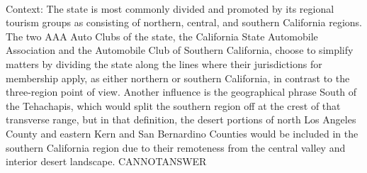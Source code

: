 \documentclass[11pt,a4paper, onecolumn]{article}
\begin{document}
\\ Context: The state is most commonly divided and promoted by its regional tourism groups as consisting of northern, central, and southern California regions. The two AAA Auto Clubs of the state, the California State Automobile Association and the Automobile Club of Southern California, choose to simplify matters by dividing the state along the lines where their jurisdictions for membership apply, as either northern or southern California, in contrast to the three-region point of view. Another influence is the geographical phrase South of the Tehachapis, which would split the southern region off at the crest of that transverse range, but in that definition, the desert portions of north Los Angeles County and eastern Kern and San Bernardino Counties would be included in the southern California region due to their remoteness from the central valley and interior desert landscape. CANNOTANSWER
\end{document}
